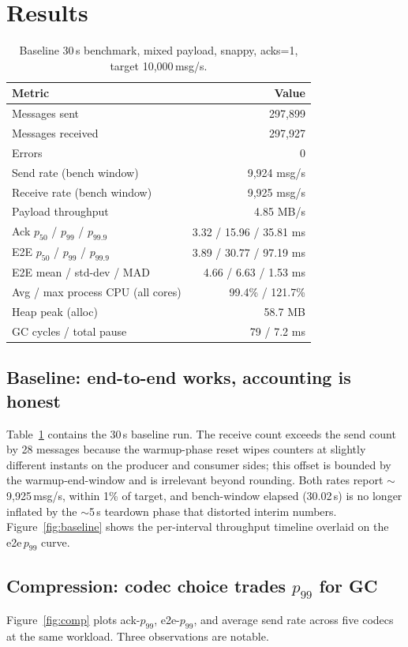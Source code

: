 \documentclass[conference]{IEEEtran}
\begin{document}
\section{Results}

\begin{table}[t]
\centering
\caption{Baseline 30\,s benchmark, mixed payload, snappy, acks=1,
target 10{,}000\,msg/s.}
\label{tab:baseline}
\begin{tabular}{lr}
\toprule
Metric & Value \\ \midrule
Messages sent & 297{,}899 \\
Messages received & 297{,}927 \\
Errors & 0 \\
Send rate (bench window) & 9{,}924 msg/s \\
Receive rate (bench window) & 9{,}925 msg/s \\
Payload throughput & 4.85 MB/s \\
Ack $p_{50}$ / $p_{99}$ / $p_{99.9}$ & 3.32 / 15.96 / 35.81 ms \\
E2E $p_{50}$ / $p_{99}$ / $p_{99.9}$ & 3.89 / 30.77 / 97.19 ms \\
E2E mean / std-dev / MAD & 4.66 / 6.63 / 1.53 ms \\
Avg / max process CPU (all cores) & 99.4\% / 121.7\% \\
Heap peak (alloc) & 58.7 MB \\
GC cycles / total pause & 79 / 7.2 ms \\
\bottomrule
\end{tabular}
\end{table}

\subsection{Baseline: end-to-end works, accounting is honest}
Table~\ref{tab:baseline} contains the 30\,s baseline run.
The receive count exceeds the send count by 28 messages because the
warmup-phase reset wipes counters at slightly different instants on
the producer and consumer sides; this offset is bounded by the
warmup-end-window and is irrelevant beyond rounding. Both rates report
$\sim$9{,}925\,msg/s, within 1\% of target, and bench-window
elapsed (30.02\,s) is no longer inflated by the
$\sim$5\,s teardown phase that distorted interim numbers.
Figure~\ref{fig:baseline} shows the per-interval throughput timeline
overlaid on the e2e\,$p_{99}$ curve.

\subsection{Compression: codec choice trades $p_{99}$ for GC}
\label{sec:comp}
Figure~\ref{fig:comp} plots ack-$p_{99}$, e2e-$p_{99}$, and average
send rate across five codecs at the same workload. Three observations
are notable.
\end{document}
